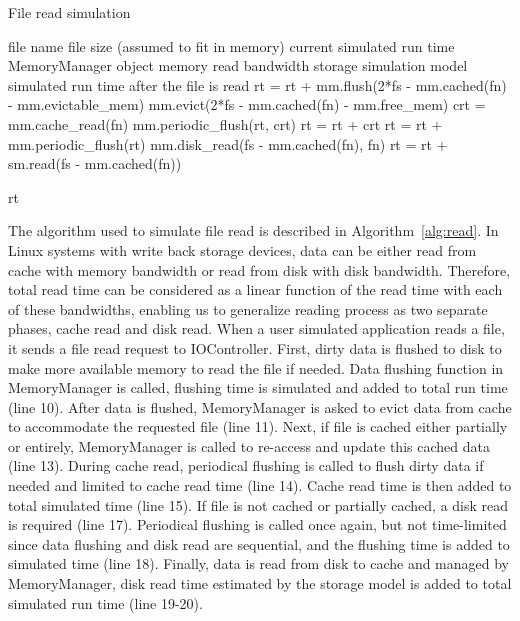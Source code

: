 \documentclass[conference]{IEEEtran}
\newcommand{\Desc}[2]{\State \makebox[2em][l]{#1}#2}
\begin{document}
			\begin{algorithm}\caption{File read simulation}\label{alg:read}
				\small
				\begin{algorithmic}[1]
					\Input
        				\Desc{fn}{file name}
        				\Desc{fs}{file size (assumed to fit in memory)}
						\Desc{rt}{current simulated run time}
						\Desc{mm}{MemoryManager object}
						\Desc{rm}{memory read bandwidth}
						\Desc{sm}{storage simulation model}
   					\EndInput
   					\Output
						\Desc{rt}{simulated run time after the file is read}
   					\EndOutput
					\State rt = rt + mm.flush(2*fs - mm.cached(fn) - mm.evictable\_mem) 
					\State mm.evict(2*fs - mm.cached(fn) - mm.free\_mem) 
					  
    					\State crt = mm.cache\_read(fn)  
    					\State mm.periodic\_flush(rt, crt) 
						\State rt = rt + crt
					\EndIf
					 
						\State rt = rt + mm.periodic\_flush(rt) 
						\State mm.disk\_read(fs - mm.cached(fn), fn)
    					\State rt = rt + sm.read(fs - mm.cached(fn))
					\EndIf					
					
					\State \Return rt
					
				\end{algorithmic}
			\end{algorithm}			
			
			The algorithm used to simulate file read is described in 
			Algorithm~\ref{alg:read}. 
			In Linux systems with write back storage devices, data can be either read 
			from cache with memory bandwidth or read from disk with disk bandwidth. 
			Therefore, total read time can be considered as a linear function 
			of the read time with each of these bandwidths, 
			enabling us to generalize reading process as two separate phases, 
			cache read and disk read. 
			When a user simulated application reads a file, 
			it sends a file read request to IOController. 
			First, dirty data is flushed to disk to make more available memory 
			to read the file if needed.
			Data flushing function in MemoryManager is called, flushing time is 
			simulated and added to total run time (line 10).
			After data is flushed, MemoryManager is asked to evict data 
			from cache to accommodate the requested file (line 11). 
			Next, if file is cached either partially or entirely, MemoryManager is 
			called to re-access and update this cached data (line 13). 
			During cache read, periodical flushing is called to flush dirty data if needed 
			and limited to cache read time (line 14).
			Cache read time is then added to total simulated time (line 15). 
			If file is not cached or partially cached, a disk read is required (line 17). 
			Periodical flushing is called once again, but not time-limited since 
			data flushing and disk read are sequential, and the flushing time is 
			added to simulated time (line 18).
			Finally, data is read from disk to cache and managed by MemoryManager, 
			disk read time estimated by the storage model is added to 
			total simulated run time (line 19-20). 
\end{document}
